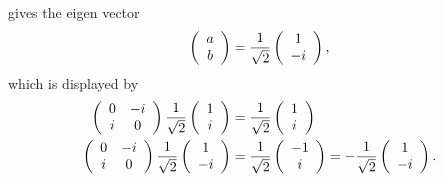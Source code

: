 \documentclass[aps,preprint]{revtex4}%
\begin{document}
gives the eigen vector
\begin{equation}
\left(
\begin{array}
[c]{c}%
a\\
b
\end{array}
\right)  =\frac{1}{\sqrt{2}}\left(
\begin{array}
[c]{c}%
1\\
-i
\end{array}
\right)  ,
\end{equation}
which is displayed by
\begin{align*}
\left(
\begin{array}
[c]{cc}%
0 & -i\\
i & 0
\end{array}
\right)  \frac{1}{\sqrt{2}}\left(
\begin{array}
[c]{c}%
1\\
i
\end{array}
\right)   &  =\frac{1}{\sqrt{2}}\left(
\begin{array}
[c]{c}%
1\\
i
\end{array}
\right) \\
\left(
\begin{array}
[c]{cc}%
0 & -i\\
i & 0
\end{array}
\right)  \frac{1}{\sqrt{2}}\left(
\begin{array}
[c]{c}%
1\\
-i
\end{array}
\right)   &  =\frac{1}{\sqrt{2}}\left(
\begin{array}
[c]{c}%
-1\\
i
\end{array}
\right)  =-\frac{1}{\sqrt{2}}\left(
\begin{array}
[c]{c}%
1\\
-i
\end{array}
\right)  .
\end{align*}
\end{document}
